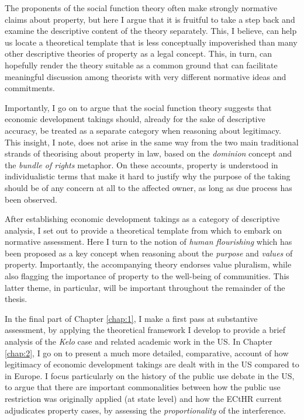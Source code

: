 The proponents of the social function theory often make strongly normative claims about property, but here I argue that it is fruitful to take a step back and examine the descriptive content of the theory separately. This, I believe, can help us locate a theoretical template that is less conceptually impoverished than many other descriptive theories of property as a legal concept. This, in turn, can hopefully render the theory suitable as a common ground that can facilitate meaningful discussion among theorists with very different normative ideas and commitments.

Importantly, I go on to argue that the social function theory suggests that economic development takings should, already for the sake of descriptive accuracy, be treated as a separate category when reasoning about legitimacy. This insight, I note, does not arise in the same way from the two main traditional strands of theorising about property in law, based on the {\it dominion} concept and the {\it bundle of rights} metaphor. On these accounts, property is understood in individualistic terms that make it hard to justify why the purpose of the taking should be of any concern at all to the affected owner, as long as due process has been observed.

After establishing economic development takings as a category of descriptive analysis, I set out to provide a theoretical template from which to embark on normative assessment. Here I turn to the notion of {\it human flourishing} which has been proposed as a key concept when reasoning about the {\it purpose} and {\it values} of property. Importantly, the accompanying theory endorses value pluralism, while also flagging the importance of property to the well-being of communities. This latter theme, in particular, will be important throughout the remainder of the thesis. 

In the final part of Chapter \ref{chap:1}, I make a first pass at substantive assessment, by applying the theoretical framework I develop to provide a brief analysis of the {\it Kelo} case and related academic work in the US. In Chapter \ref{chap:2}, I go on to present a much more detailed, comparative, account of how legitimacy of economic development takings are dealt with in the US compared to in Europe. I focus particularly on the history of the public use debate in the US, to argue that there are important commonalities between how the public use restriction was originally applied (at state level) and how the ECtHR current adjudicates property cases, by assessing the {\it proportionality} of the interference.


